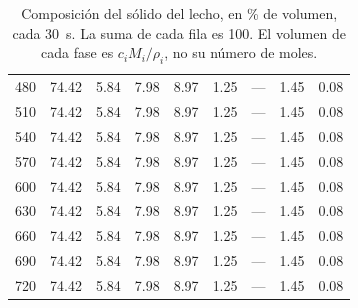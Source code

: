 \begin{table}[htbp]
\begin{tabular}{rrrrrrrrr}
480 & \num{74.42} & \num{5.84} & \num{7.98} & \num{8.97} & \num{1.25} & --- & \num{1.45} & \num{0.08} \\
510 & \num{74.42} & \num{5.84} & \num{7.98} & \num{8.97} & \num{1.25} & --- & \num{1.45} & \num{0.08} \\
540 & \num{74.42} & \num{5.84} & \num{7.98} & \num{8.97} & \num{1.25} & --- & \num{1.45} & \num{0.08} \\
570 & \num{74.42} & \num{5.84} & \num{7.98} & \num{8.97} & \num{1.25} & --- & \num{1.45} & \num{0.08} \\
600 & \num{74.42} & \num{5.84} & \num{7.98} & \num{8.97} & \num{1.25} & --- & \num{1.45} & \num{0.08} \\
630 & \num{74.42} & \num{5.84} & \num{7.98} & \num{8.97} & \num{1.25} & --- & \num{1.45} & \num{0.08} \\
660 & \num{74.42} & \num{5.84} & \num{7.98} & \num{8.97} & \num{1.25} & --- & \num{1.45} & \num{0.08} \\
690 & \num{74.42} & \num{5.84} & \num{7.98} & \num{8.97} & \num{1.25} & --- & \num{1.45} & \num{0.08} \\
720 & \num{74.42} & \num{5.84} & \num{7.98} & \num{8.97} & \num{1.25} & --- & \num{1.45} & \num{0.08} \\
\bottomrule
\end{tabular}
\caption{Composición del sólido del lecho, en \% de volumen, cada \SI{30}{\second}. La suma de cada fila es \num{100}. El volumen de cada fase es $c_i M_i/\rho_i$, no su número de moles.}
\label{tab:fases}
\end{table}

